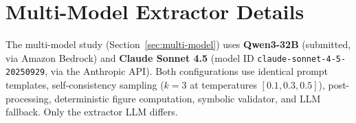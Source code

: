 \documentclass[11pt]{article}
\begin{document}
\section{Multi-Model Extractor Details}
\label{app:multi-model}

The multi-model study (Section~\ref{sec:multi-model}) uses \textbf{Qwen3-32B} (submitted, via Amazon Bedrock) and \textbf{Claude Sonnet 4.5} (model ID \texttt{claude-sonnet-4-5-20250929}, via the Anthropic API). Both configurations use identical prompt templates, self-consistency sampling ($k=3$ at temperatures $[0.1, 0.3, 0.5]$), post-processing, deterministic figure computation, symbolic validator, and LLM fallback. Only the extractor LLM differs.
\end{document}
